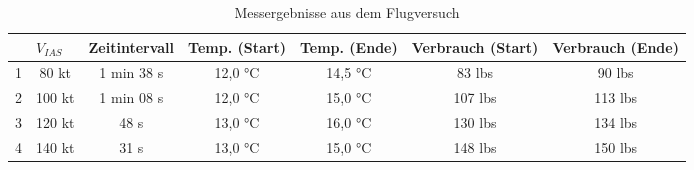 \begin{table}[h]
	\begin{tabular}{|c|c|c|c|c|c|c|}
		\hline
		& \multicolumn{1}{l|}{\textbf{$V_{IAS}$}} & \multicolumn{1}{l|}{\textbf{Zeitintervall}} & \multicolumn{1}{l|}{\textbf{Temp. (Start)}} & \multicolumn{1}{l|}{\textbf{Temp. (Ende)}} & \multicolumn{1}{l|}{\textbf{Verbrauch (Start)}} & \multicolumn{1}{l|}{\textbf{Verbrauch (Ende)}} \\ \hline
		1 & 80 kt                                         & 1 min 38 s                                  & 12,0 °C                                 & 14,5 °C                                & 83 lbs                                          & 90 lbs                                         \\ \hline
		2 & 100 kt                                        & 1 min 08 s                                  & 12,0 °C                                 & 15,0 °C                                & 107 lbs                                         & 113 lbs                                        \\ \hline
		3 & 120 kt                                        & 48 s                                        & 13,0 °C                                 & 16,0 °C                                & 130 lbs                                         & 134 lbs                                        \\ \hline
		4 & 140 kt                                         & 31 s                                        & 13,0  °C                                & 15,0 °C                                & 148 lbs                                         & 150 lbs                                        \\ \hline
	\end{tabular}
	\caption{Messergebnisse aus dem Flugversuch}
\end{table}

\newpage
